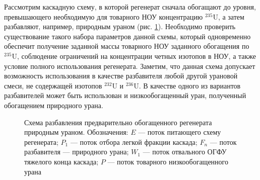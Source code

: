 Рассмотрим каскадную схему, в которой регенерат сначала обогащают до уровня, превышающего необходимую для товарного НОУ концентрацию $^{235}$U, а затем разбавляют, например, природным ураном (рис. \ref{o1}). Необходимо проверить существование такого набора параметров данной схемы, который одновременно обеспечит получение заданной массы товарного НОУ заданного обогащения по $^{235}$U, соблюдение ограничений на концентрации четных изотопов в НОУ, а также условие полного использования регенерата. Заметим, что данная схема допускает возможность использования в качестве разбавителя любой другой урановой смеси, не содержащей изотопов $^{232}$U и $^{236}$U. В качестве одного из вариантов разбавителей может быть использован и низкообогащенный уран, полученный обогащением природного урана.

\begin{figure}[ht]
  \caption{Схема разбавления предварительно обогащенного регенерата природным ураном. Обозначения: $E$ --- поток питающего схему регенерата; $P_1$ --- поток отбора легкой фракции каскада; $F_n$ --- поток разбавителя --- природного урана; $W_1$ --- поток отвального ОГФУ тяжелого конца каскада; $P$ --- поток товарного низкообогащенного урана}\label{o1}
\end{figure}

